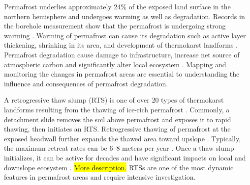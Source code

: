 \documentclass[preprint,12pt,authoryear]{elsarticle}
\begin{document}
Permafrost underlies approximately 24\% of the exposed land surface in the northern hemisphere \citep{zhang_statistics_1999} and undergoes warming as well as degradation. Records in the borehole measurement show that the permafrost is undergoing strong warming \citep{marchenko_permafrost_2007,osterkamp2005recent,romanovsky_thermal_2010,romanovsky_permafrost_2010,wu_recent_2008,zhao_thermal_2010}. Warming of permafrost can cause its degradation such as active layer thickening, shrinking in its area, and development of thermokarst landforms \citep{zhao_thermal_2010,akerman_thawing_2008,czudek_thermokarst_1970,jorgenson_response_2005,osterkamp_characteristics_2007}. Permafrost degradation cause damage to infrastructure, increase net source of atmospheric carbon and significantly alter local ecosystem \citep{tong_effect_1996,grosse_vulnerability_2011,olefeldt_circumpolar_2016,schuur_climate_2015,tarnocai_soil_2009,schuster2018permafrost}. Mapping and monitoring the changes in permafrost areas are essential to understanding the influence and consequences of permafrost degradation. 

A retrogressive thaw slump (RTS) is one of over 20 types of thermokarst landforms resulting from the thawing of ice-rich permafrost \citep{czudek_thermokarst_1970, jorgenson_response_2005, jorgenson_thermokarst_2013,kokelj2013advances}. Commonly, a detachment slide removes the soil above permafrost and exposes it to rapid thawing, then initiates an RTS. Retrogressive thawing of permafrost at the exposed headwall further expands the thawed area toward upslope \citep{jorgenson_thermokarst_2013}. Typically, the maximum retreat rates can be 6–8 meters per year \citep{jorgenson_thermokarst_2013}. Once a thaw slump initializes, it can be active for decades \citep{burn1989geomorphology, lacelle2010climatic, swanson2018growth} and have significant impacts on local and downslope ecosystem \citep{gooseff2009effects, pierre2018unprecedented, zolkos2018mineral}. \hl{More description.}  RTSs are one of the most dynamic features in permafrost areas and require intensive investigation.
\end{document}
